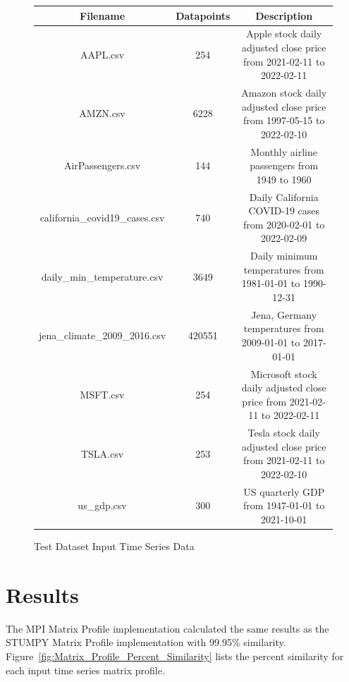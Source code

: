 \documentclass[conference]{IEEEtran}
\begin{document}
\begin{figure}
\begin{center}
\caption{Test Dataset Input Time Series Data}
\begin{tabular}{|c|c|c|}
\hline
\textbf{Filename} & \textbf{Datapoints} & \textbf{Description} \\ \hline \hline
AAPL.csv & 254 & Apple stock daily adjusted close price from 2021-02-11 to 2022-02-11 \\ \hline
AMZN.csv & 6228 & Amazon stock daily adjusted close price from 1997-05-15 to 2022-02-10 \\ \hline
AirPassengers.csv & 144 & Monthly airline passengers from 1949 to 1960 \\ \hline
california\_covid19\_cases.csv & 740 & Daily California COVID-19 cases from 2020-02-01 to 2022-02-09 \\ \hline
daily\_min\_temperature.csv & 3649 & Daily minimum temperatures from 1981-01-01 to 1990-12-31  \\ \hline
jena\_climate\_2009\_2016.csv & 420551 & Jena, Germany temperatures from 2009-01-01 to 2017-01-01  \\ \hline
MSFT.csv & 254 & Microsoft stock daily adjusted close price from 2021-02-11 to 2022-02-11 \\ \hline
TSLA.csv & 253 & Tesla stock daily adjusted close price from 2021-02-11 to 2022-02-10 \\ \hline
us\_gdp.csv & 300 & US quarterly GDP from 1947-01-01 to 2021-10-01 \\ \hline
\hline
\end{tabular}
\label{fig:Input_Time_Series}
\end{center}
\end{figure}

\section{Results}

The MPI Matrix Profile implementation calculated the same results as the STUMPY Matrix Profile implementation with 99.95\% similarity.  Figure~\ref{fig:Matrix_Profile_Percent_Similarity} lists the percent similarity for each input time series matrix profile. 
\end{document}

